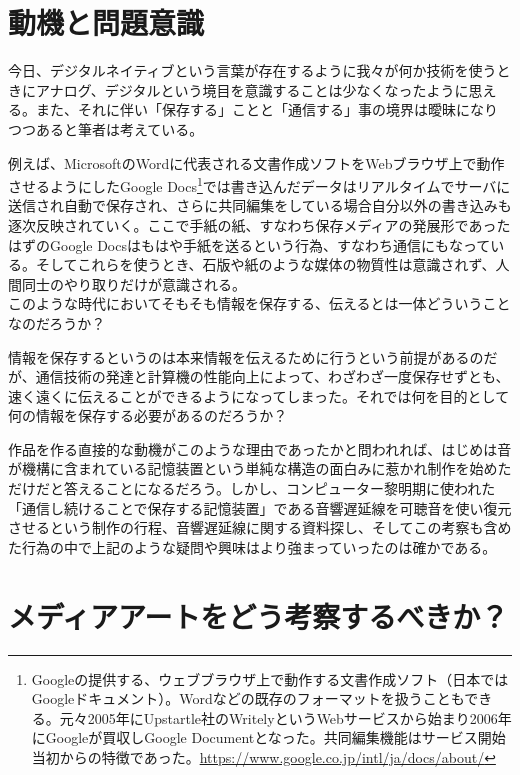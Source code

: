 \documentclass[a4paper,report]{jsbook}
\begin{document}
\section{動機と問題意識}\label{ux52d5ux6a5fux3068ux554fux984cux610fux8b58}

今日、デジタルネイティブという言葉が存在するように我々が何か技術を使うときにアナログ、デジタルという境目を意識することは少なくなったように思える。また、それに伴い「保存する」ことと「通信する」事の境界は曖昧になりつつあると筆者は考えている。

例えば、MicrosoftのWordに代表される文書作成ソフトをWebブラウザ上で動作させるようにしたGoogle
Docs\footnote{Googleの提供する、ウェブブラウザ上で動作する文書作成ソフト（日本ではGoogleドキュメント）。Wordなどの既存のフォーマットを扱うこともできる。元々2005年にUpstartle社のWritelyというWebサービスから始まり2006年にGoogleが買収しGoogle
  Documentとなった。共同編集機能はサービス開始当初からの特徴であった。\url{https://www.google.co.jp/intl/ja/docs/about/}}では書き込んだデータはリアルタイムでサーバに送信され自動で保存され、さらに共同編集をしている場合自分以外の書き込みも逐次反映されていく。ここで手紙の紙、すなわち保存メディアの発展形であったはずのGoogle
Docsはもはや手紙を送るという行為、すなわち通信にもなっている。そしてこれらを使うとき、石版や紙のような媒体の物質性は意識されず、人間同士のやり取りだけが意識される。\\
このような時代においてそもそも情報を保存する、伝えるとは一体どういうことなのだろうか？

情報を保存するというのは本来情報を伝えるために行うという前提があるのだが、通信技術の発達と計算機の性能向上によって、わざわざ一度保存せずとも、速く遠くに伝えることができるようになってしまった。それでは何を目的として何の情報を保存する必要があるのだろうか？

作品を作る直接的な動機がこのような理由であったかと問われれば、はじめは音が機構に含まれている記憶装置という単純な構造の面白みに惹かれ制作を始めただけだと答えることになるだろう。しかし、コンピューター黎明期に使われた「通信し続けることで保存する記憶装置」である音響遅延線を可聴音を使い復元させるという制作の行程、音響遅延線に関する資料探し、そしてこの考察も含めた行為の中で上記のような疑問や興味はより強まっていったのは確かである。

\section{メディアアートをどう考察するべきか？}\label{ux30e1ux30c7ux30a3ux30a2ux30a2ux30fcux30c8ux3092ux3069ux3046ux8003ux5bdfux3059ux308bux3079ux304dux304b}
\end{document}
